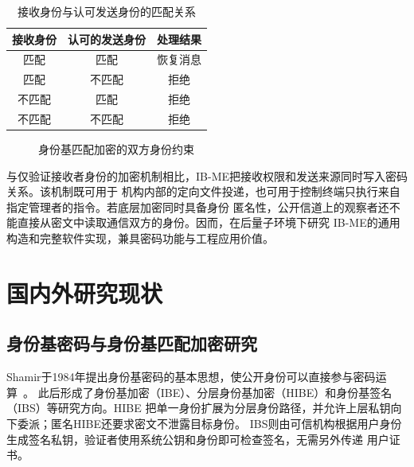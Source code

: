 \begin{table}[H]
\centering\small
\caption{接收身份与认可发送身份的匹配关系}
\label{tab:identity-cases}
\begin{tabular}{ccc}
\toprule
\rowcolor{black!8} 接收身份 & 认可的发送身份 & 处理结果 \\
\midrule
匹配 & 匹配 & 恢复消息 \\
匹配 & 不匹配 & 拒绝 \\
不匹配 & 匹配 & 拒绝 \\
不匹配 & 不匹配 & 拒绝 \\
\bottomrule
\end{tabular}
\end{table}

\begin{figure}[H]
\centering
{}
\caption{身份基匹配加密的双方身份约束}
\label{fig:identity-match}
\end{figure}

与仅验证接收者身份的加密机制相比，IB-ME把接收权限和发送来源同时写入密码关系。该机制既可用于
机构内部的定向文件投递，也可用于控制终端只执行来自指定管理者的指令。若底层加密同时具备身份
匿名性，公开信道上的观察者还不能直接从密文中读取通信双方的身份。因而，在后量子环境下研究
IB-ME的通用构造和完整软件实现，兼具密码功能与工程应用价值。

\section{国内外研究现状}

\subsection{身份基密码与身份基匹配加密研究}

Shamir于1984年提出身份基密码的基本思想，使公开身份可以直接参与密码运算~\cite{shamir1984}。
此后形成了身份基加密（IBE）、分层身份基加密（HIBE）和身份基签名（IBS）等研究方向。HIBE
把单一身份扩展为分层身份路径，并允许上层私钥向下委派；匿名HIBE还要求密文不泄露目标身份。
IBS则由可信机构根据用户身份生成签名私钥，验证者使用系统公钥和身份即可检查签名，无需另外传递
用户证书。

